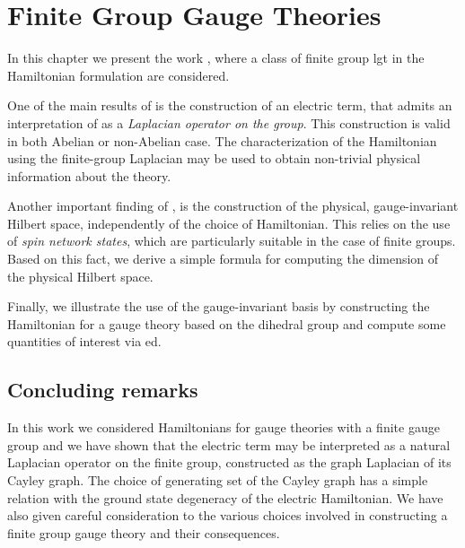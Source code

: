 \chapter{Finite Group Gauge Theories}
\label{chap:finite_group_gauge_theories}

In this chapter we present the work \cite{pradhan_unpublished}, where a class of finite group \ac{lgt} in the Hamiltonian formulation are considered.

One of the main results of \cite{pradhan_unpublished} is the construction of an electric term, that admits an interpretation of as a \emph{Laplacian operator on the group}.
This construction is valid in both Abelian or non-Abelian case.
The characterization of the Hamiltonian using the finite-group Laplacian may be used to obtain non-trivial physical information about the theory.

Another important finding of \cite{pradhan_unpublished}, is the construction of the physical, gauge-invariant Hilbert space, independently of the choice of Hamiltonian.
This relies on the use of \emph{spin network states}, which are particularly suitable in the case of finite groups.
Based on this fact, we derive a simple formula for computing the dimension of the physical Hilbert space.

Finally, we illustrate the use of the gauge-invariant basis by constructing the Hamiltonian for a gauge theory based on the dihedral group and compute some quantities of interest via \ac{ed}.









\section{Concluding remarks}
\label{sec:concluding_remarks_finite}


In this work we considered Hamiltonians for gauge theories with a finite gauge group and we have shown that the electric term may be interpreted as a natural Laplacian operator on the finite group, constructed as the graph Laplacian of its Cayley graph.
The choice of generating set of the Cayley graph has a simple relation with the ground state degeneracy of the electric Hamiltonian.
We have also given careful consideration to the various choices involved in constructing a finite group gauge theory and their consequences.

